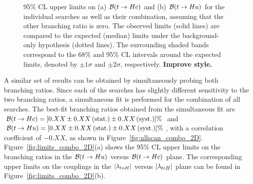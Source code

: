 \begin{figure}[htbp]
\begin{center}
\caption{\small {95\% CL upper limits on (a) $\mathcal{B}(t\to Hc)$ and (b) $\mathcal{B}(t\to Hu)$ for the individual searches as well as their
combination, assuming that the other branching ratio is zero. The observed limits (solid lines) are compared to the 
expected (median) limits under the background-only
hypothesis (dotted lines). The surrounding shaded bands correspond to the 68\% and 95\% CL intervals around the expected limits, 
denoted by $\pm 1\sigma$ and $\pm 2\sigma$, respectively. \textbf{Improve style.}
}}
\label{fig:limits_combo_1D} 
\end{center}
\end{figure}

A similar set of results can be obtained by  simultaneously probing both branching ratios. Since each of the searches has
slightly different sensitivity to the two branching ratios, a simultaneous fit is performed for the combination of all searches.
The best-fit branching ratios obtained from the simultaneous fit are 
$\mathcal{B}(t\to Hc)=[0.XX \pm 0.XX\,(\mathrm{ stat.}) \pm 0.XX\,(\mathrm{ syst.})]\%$ and 
$\mathcal{B}(t\to Hu)=[0.XX \pm 0.XX\,(\mathrm{ stat.}) \pm 0.XX\,(\mathrm{ syst.})]\%$, with a correlation coefficient of $-0.XX$, 
as shown in Figure~\ref{fig:nllscan_combo_2D}.
Figure~\ref{fig:limits_combo_2D}(a) shows the 95\% CL upper limits on the branching ratios in the $\mathcal{B}(t\to Hu)$ versus $\mathcal{B}(t\to Hc)$ plane. 
The corresponding upper limits on the couplings in the $|\lambda_{tuH}|$ versus $|\lambda_{tcH}|$ plane can be found in Figure~\ref{fig:limits_combo_2D}(b).

